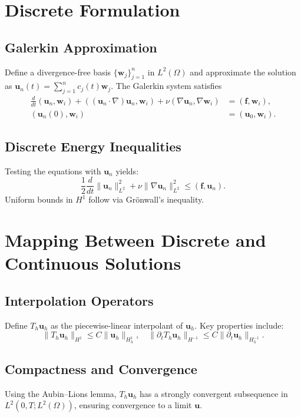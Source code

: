 \documentclass[12pt]{article}
\numberwithin{equation}{section}
\begin{document}
\section{Discrete Formulation}
\subsection{Galerkin Approximation}
Define a divergence-free basis $\{\mathbf{w}_j\}_{j=1}^n$ in $L^2(\Omega)$ and approximate the solution as $\mathbf{u}_n(t) = \sum_{j=1}^n c_j(t) \mathbf{w}_j$. The Galerkin system satisfies
\begin{align}
    \frac{d}{dt}(\mathbf{u}_n, \mathbf{w}_i) + ((\mathbf{u}_n \cdot \nabla) \mathbf{u}_n, \mathbf{w}_i) + \nu (\nabla \mathbf{u}_n, \nabla \mathbf{w}_i) &= (\mathbf{f}, \mathbf{w}_i), \\
    (\mathbf{u}_n(0), \mathbf{w}_i) &= (\mathbf{u}_0, \mathbf{w}_i).
\end{align}
\subsection{Discrete Energy Inequalities}
Testing the equations with $\mathbf{u}_n$ yields:
\begin{equation}
    \frac{1}{2} \frac{d}{dt} \|\mathbf{u}_n\|_{L^2}^2 + \nu \|\nabla \mathbf{u}_n\|_{L^2}^2 \leq (\mathbf{f}, \mathbf{u}_n).
\end{equation}
Uniform bounds in $H^1$ follow via Gr\"onwall's inequality.

\section{Mapping Between Discrete and Continuous Solutions}
\subsection{Interpolation Operators}
Define $T_h \mathbf{u}_h$ as the piecewise-linear interpolant of $\mathbf{u}_h$. Key properties include:
\begin{equation}
    \|T_h \mathbf{u}_h\|_{H^1} \leq C \|\mathbf{u}_h\|_{H^1_h}, \quad \|\partial_t T_h \mathbf{u}_h\|_{H^{-1}} \leq C \|\partial_t \mathbf{u}_h\|_{H^{-1}_h}.
\end{equation}
\subsection{Compactness and Convergence}
Using the Aubin--Lions lemma, $T_h \mathbf{u}_h$ has a strongly convergent subsequence in $L^2(0,T;L^2(\Omega))$, ensuring convergence to a limit $\mathbf{u}$.
\end{document}
